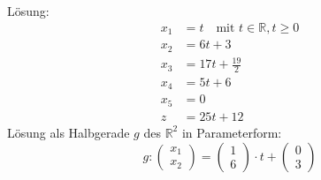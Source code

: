 \documentclass[a4paper]{scrartcl}
\begin{document}
\begin{enumerate}
\begin{enumerate}
                Lösung:
                \begin{equation}
                    \begin{split}
                        x_1 &= t \quad \text{mit } t \in \mathbb{R}, t \geq 0 \\
                        x_2 &= 6t + 3 \\
                        x_3 &= 17t + \frac{19}{2} \\
                        x_4 &= 5t + 6 \\
                        x_5 &= 0 \\
                        z   &= 25t + 12
                    \end{split}
                \end{equation}
                Lösung als Halbgerade $g$ des $\mathbb{R}^2$ in Parameterform:
                \begin{equation}
                    g\colon
                    \begin{pmatrix}
                        x_1 \\ x_2
                    \end{pmatrix}
                    =
                    \begin{pmatrix}
                        1 \\ 6
                    \end{pmatrix}
                    \cdot t +
                    \begin{pmatrix}
                        0 \\ 3
                    \end{pmatrix}
                \end{equation}


\end{enumerate}
\end{enumerate}
\end{document}
